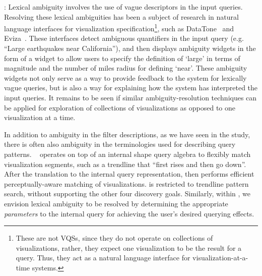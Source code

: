 : 
Lexical ambiguity involves the use of 
vague descriptors in the input queries. 
Resolving these lexical ambiguities 
has been a subject of research in 
natural language interfaces for 
visualization specification\footnote{These are not VQSs, since
they do not operate on collections of visualizations,
rather, they expect one visualization to be the result for a query. Thus,
they act as a natural language interface for visualization-at-a-time systems.}, 
such as DataTone~\cite{Gao2015} and Eviza~\cite{Setlur2016}. 
These interfaces detect ambiguous quantifiers 
in the input query (e.g. ``Large earthquakes near California''), 
and then displays ambiguity widgets 
in the form of a widget to allow users 
to specify the definition of `large' 
in terms of magnitude and the number of miles 
radius for defining 
`near'. 
These ambiguity widgets not only serve as a 
way to provide feedback to the system for 
lexically vague queries, 
but is also a way for explaining 
how the system has interpreted the input queries. 
It remains to be seen if similar ambiguity-resolution techniques
can be applied for exploration of collections of
visualizations as opposed to one visualization at a time.

In addition to ambiguity in the filter descriptions, 
as we have seen in the \zv study, 
there is often also ambiguity in the terminologies 
used for describing query patterns. 
\ssearch~\cite{Siddiqui2018} operates 
on top of an internal shape query algebra 
to flexibly match visualization segments, 
such as a trendline that ``first rises and then go down''. 
After the translation to the 
internal query representation, 
\ssearch then performs efficient 
perceptually-aware matching of visualizations. 
\ssearch is restricted to trendline pattern
search, without supporting the other four discovery goals.
Similarly, within \vida , 
we envision lexical ambiguity to be 
resolved by determining the 
appropriate \textit{parameters} 
to the internal \vidaql query for 
achieving the user's desired querying effects.

